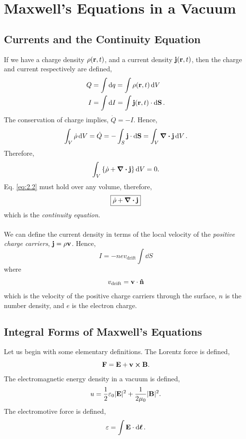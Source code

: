 \documentclass{book}
\begin{document}
\chapter{Maxwell's Equations in a Vacuum}
\section{Currents and the Continuity Equation}
If we have a charge density $\rho(\vb{r},t)$, and a current density $\vb{j}(\vb{r},t)$, then the charge and current respectively are defined,
\begin{align}
	Q &= \int \dd{q} = \int\rho(\vb{r},t)\dd{V} \\
	I &= \int \dd{I} = \int \vb{j}(\vb{r},t)\cdot \dd{\vb{S}}.
\end{align}
The conservation of charge implies, $\Dot{Q} = -I$. Hence,
\begin{equation}
	\int_V \Dot{\rho} \dd{V} = \Dot{Q} = - \int_S\vb{j}\cdot\dd{\vb{S}} = \int_V\div{\vb{j}}\dd{V}.
\end{equation}
Therefore,
\begin{equation}
	\int_V\left\{\Dot{\rho} + \div{\vb{j}}\right\}\dd{V} = 0. \label{eq:2.2}
\end{equation}
Eq. \eqref{eq:2.2} must hold over any volume, therefore,
\begin{equation}
	\boxed{\Dot{\rho} + \div{\vb{j}}}
\end{equation}
which is the \textit{continuity equation}.
\\\\
We can define the current density in terms of the local velocity of the \textit{positive charge carriers}, $\vb{j} = \rho\vb{v}$. Hence,
\begin{equation}
	I = -nev_{\text{drift}} \int\dd{S}
\end{equation}
where
\begin{equation}
	v_{\text{drift}} = \vb{v}\cdot\vu{n}
\end{equation}
which is the velocity of the positive charge carriers through the surface, $n$ is the number density, and $e$ is the electron charge.
\section{Integral Forms of Maxwell's Equations}
Let us begin with some elementary definitions. The Lorentz force is defined,
\begin{equation}
	\vb{F} = 	\vb{E} + \vb{v}\cross\vb{B}.
\end{equation}
The electromagnetic energy density in a vacuum is defined,
\begin{equation}
	u = \frac{1}{2}\varepsilon_0 |\vb{E}|^2 + \frac{1}{2\mu_0}|\vb{B}|^2.
\end{equation}
The electromotive force is defined,
\begin{equation}
	\varepsilon = \int \vb{E}\cdot \dd{\vb*{\ell}}.
\end{equation}
\end{document}

